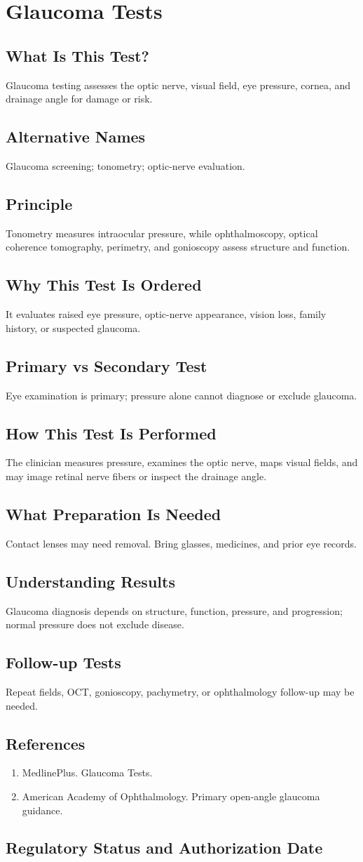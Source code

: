 \chapter{Glaucoma Tests}
\section*{What Is This Test?} Glaucoma testing assesses the optic nerve, visual field, eye pressure, cornea, and drainage angle for damage or risk.\section*{Alternative Names} Glaucoma screening; tonometry; optic-nerve evaluation.\section*{Principle} Tonometry measures intraocular pressure, while ophthalmoscopy, optical coherence tomography, perimetry, and gonioscopy assess structure and function.\section*{Why This Test Is Ordered} It evaluates raised eye pressure, optic-nerve appearance, vision loss, family history, or suspected glaucoma.\section*{Primary vs Secondary Test} Eye examination is primary; pressure alone cannot diagnose or exclude glaucoma.\section*{How This Test Is Performed} The clinician measures pressure, examines the optic nerve, maps visual fields, and may image retinal nerve fibers or inspect the drainage angle.\section*{What Preparation Is Needed} Contact lenses may need removal. Bring glasses, medicines, and prior eye records.\section*{Understanding Results} Glaucoma diagnosis depends on structure, function, pressure, and progression; normal pressure does not exclude disease.\section*{Follow-up Tests} Repeat fields, OCT, gonioscopy, pachymetry, or ophthalmology follow-up may be needed.\section*{References} \begin{enumerate}\item MedlinePlus. Glaucoma Tests.\item American Academy of Ophthalmology. Primary open-angle glaucoma guidance.\end{enumerate}\clearpage\section*{Regulatory Status and Authorization Date}\clearpage
